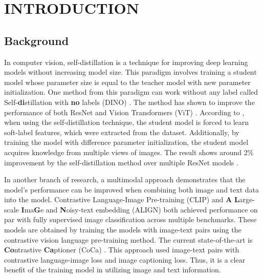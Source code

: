 \setlength{\parindent}{0in}
\setlength{\parskip}{1.5mm}
\setlength{\baselineskip}{1.6em}

\chapter{INTRODUCTION}
\section{Background}

In computer vision, self-distillation  is a technique for improving deep learning models without increasing model size.
This paradigm involves training a student model whose parameter size is equal to the teacher model with new parameter initialization.
One method from this paradigm can work without any label called Self-\textbf{di}stillation with \textbf{no} labels (DINO) .
The method has shown to improve the performance of both ResNet  and Vision Transformers (ViT) .
According to , when using the self-distillation technique, the student model is forced to learn soft-label features, which were extracted from the dataset. Additionally, by training the model with difference parameter initialization, the student model acquires knowledge from multiple views of images. The result shows around 2\% improvement by the self-distillation method over multiple ResNet models .

In another branch of research, a multimodal approach demonstrates that the model's performance can be improved when combining both image and text data into the model.
Contrastive Language-Image Pre-training (CLIP)  and \textbf{A} \textbf{L}arge-scale \textbf{I}ma\textbf{G}e and \textbf{N}oisy-text embedding (ALIGN)  both achieved performance on par with fully supervised image classification across multiple benchmarks.
These models are obtained by training the models with image-text pairs using the contrastive vision language pre-training method.
The current state-of-the-art is \textbf{Co}ntrastive \textbf{Ca}ptioner (CoCa) .
This approach used image-text pairs with contrastive language-image loss and image captioning loss.
Thus, it is a clear benefit of the training model in utilizing image and text information.

